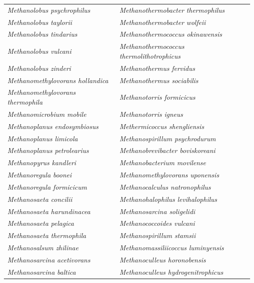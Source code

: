 \documentclass[fontsize=12pt,headsepline=true, bibliography=totocnumbered, twoside]{scrbook} %
\begin{document}
\begin{table}[]
\begin{tabular}{ll}
\textit{Methanolobus psychrophilus}       & \textit{Methanothermobacter thermophilus}         \\
\textit{Methanolobus taylorii}            & \textit{Methanothermobacter wolfeii}              \\
\textit{Methanolobus tindarius}           & \textit{Methanothermococcus okinawensis}          \\
\textit{Methanolobus vulcani}             & \textit{Methanothermococcus thermolithotrophicus} \\
\textit{Methanolobus zinderi}             & \textit{Methanothermus fervidus}                  \\
\textit{Methanomethylovorans hollandica}  & \textit{Methanothermus sociabilis}                \\
\textit{Methanomethylovorans thermophila} & \textit{Methanotorris formicicus}                 \\
\textit{Methanomicrobium mobile}          & \textit{Methanotorris igneus}                     \\
\textit{Methanoplanus endosymbiosus}      & \textit{Methermicoccus shengliensis}              \\
\textit{Methanoplanus limicola}           & \textit{Methanospirillum psychrodurum}            \\
\textit{Methanoplanus petrolearius}       & \textit{Methanobrevibacter boviskoreani}          \\
\textit{Methanopyrus kandleri}            & \textit{Methanobacterium movilense}               \\
\textit{Methanoregula boonei}             & \textit{Methanomethylovorans uponensis}           \\
\textit{Methanoregula formicicum}         & \textit{Methanocalculus natronophilus}            \\
\textit{Methanosaeta concilii}            & \textit{Methanohalophilus levihalophilus}         \\
\textit{Methanosaeta harundinacea}        & \textit{Methanosarcina soligelidi}                \\
\textit{Methanosaeta pelagica}            & \textit{Methanococcoides vulcani}                 \\
\textit{Methanosaeta thermophila}         & \textit{Methanospirillum stamsii}                 \\
\textit{Methanosalsum zhilinae}           & \textit{Methanomassiliicoccus luminyensis}        \\
\textit{Methanosarcina acetivorans}       & \textit{Methanoculleus horonobensis}              \\
\textit{Methanosarcina baltica}           & \textit{Methanoculleus hydrogenitrophicus}       
\end{tabular}
\end{table}
\end{document}
